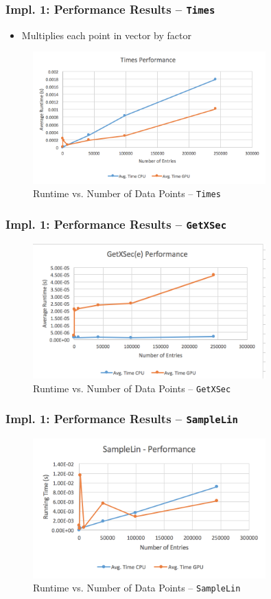 \documentclass{beamer}
\begin{document}
\begin{frame}
\frametitle{Impl. 1: Performance Results -- \texttt{Times}}
\begin{itemize}
\item Multiplies each point in vector by factor
\end{itemize}
\begin{figure}
\centering
\includegraphics[width=0.8\textwidth]{images/times_line.png}
\caption{Runtime vs. Number of Data Points -- \texttt{Times}}
\end{figure}
\end{frame}

\begin{frame}
\frametitle{Impl. 1: Performance Results -- \texttt{GetXSec}}
\begin{figure}
\centering
\includegraphics[width=0.8\textwidth]{images/getxsec_e_line.png}
\caption{Runtime vs. Number of Data Points -- \texttt{GetXSec}}
\end{figure}
\end{frame}

\begin{frame}
\frametitle{Impl. 1: Performance Results -- \texttt{SampleLin}}
\begin{figure}
\centering
\includegraphics[width=0.8\textwidth]{images/samplelin_line.png}
\caption{Runtime vs. Number of Data Points -- \texttt{SampleLin}}
\end{figure}
\end{frame}
\end{document}
